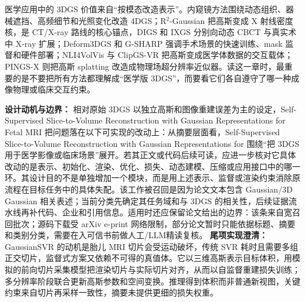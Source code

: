 医学应用中的 3DGS 价值来自“按模态改造表示”。内窥镜方法围绕动态组织、器械遮挡、高频细节和光照变化改造 4DGS；R$^2$-Gaussian 把高斯变成 X 射线密度核，是 CT/X-ray 路线的核心锚点，DIGS 和 IXGS 分别向动态 CBCT 与真实术中 X-ray 扩展；Deform3DGS 和 G-SHARP 强调手术场景的快速训练、mask 监督和硬件部署；NLI4VolVis 与 ClipGS-VR 把高斯变成医学体数据的交互载体；PINGS-X 则把高斯 splatting 改造成物理场超分辨率近似器。读这一章时，最重要的是不要把所有方法都理解成“医学版 3DGS”，而要看它们各自遵守了哪一种成像物理或临床交互约束。

\textbf{设计动机与边界：} 相对原始 3DGS 以独立高斯和图像重建误差为主的设定，Self-Supervised Slice-to-Volume Reconstruction with Gaussian Representations for Fetal MRI 把问题落在以下可实现的改动上：从摘要层面看，Self-Supervised Slice-to-Volume Reconstruction with Gaussian Representations for 围绕“把 3DGS 用于医学影像或临床场景”展开。若其正文或代码后续可读，应进一步核对它具体改动的是表示、初始化、渲染、优化、损失、动态建模、压缩或应用接口中的哪一环。其设计目的不是单独增加一个模块，而是用上述表示、监督或渲染约束消除原流程在目标任务中的具体失配。该工作被召回是因为论文文本包含 Gaussian/3D Gaussian 相关表述；当前分类先确定其任务域和与 3DGS 的相关性，后续证据流水线再补代码、企业和引用信息。适用时还应保留论文给出的边界：该条来自宽召回批次；源码下载受 arXiv e-print 网络限制，部分论文暂时只能依据标题、摘要和类别分类，需要在入可信书前做人工/LLM精读复核。
\textbf{尾项实现澄清：} GaussianSVR 的动机是胎儿 MRI 切片会受运动破坏，传统 SVR 耗时且需要多组正交切片，监督式方案又依赖不可得的真值体。它以三维高斯表示目标体积，用模拟的前向切片采集模型把渲染切片与实际切片对齐，从而以自监督重建损失训练；多分辨率阶段联合更新高斯参数和空间变换。推理得到体积而非普通新视图，关键约束来自切片再采样一致性，摘要未提供更细的损失权重。
